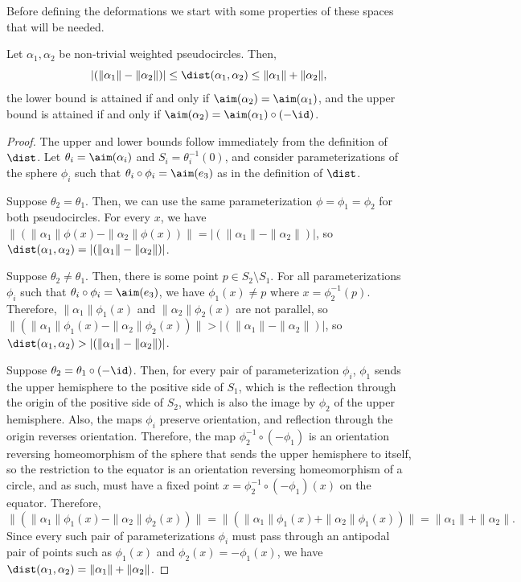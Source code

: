 Before defining the deformations we start with some properties of these spaces that will be needed.

\begin{lemma}\label{lemma-pseudocircle-dist}
Let $\alpha_1,\alpha_2$ be non-trivial weighted pseudocircles.
Then,
\[\left|\left(\|\alpha_1\|-\|\alpha_2\|\right)\right| \leq \dist(\alpha_1,\alpha_2) \leq \|\alpha_1\|+\|\alpha_2\|,\]
the lower bound is attained if and only if $\aim(\alpha_2) = \aim(\alpha_1)$,
and the upper bound is attained if and only if $\aim(\alpha_2) = \aim(\alpha_1)\circ(-\id)$.
\end{lemma}

\begin{proof}
The upper and lower bounds follow immediately from the definition of $\dist$.
Let $\theta_i = \aim(\alpha_i)$ and $S_i = \theta_i^{-1}(0)$,
and consider parameterizations of the sphere $\phi_i$ such that $\theta_i \circ \phi_i = \aim(e_3)$ as in the definition of $\dist$.

Suppose $\theta_2=\theta_1$. Then, we can use the same parameterization $\phi = \phi_1 = \phi_2$ for both pseudocircles.
For every $x$, we have
$\|(\|\alpha_1\|\phi(x) - \|\alpha_2\|\phi(x))\| = \left|(\|\alpha_1\|-\|\alpha_2\|)\right|$,
so $\dist(\alpha_1,\alpha_2) = \left|(\|\alpha_1\|-\|\alpha_2\|)\right|$.

Suppose $\theta_2\neq \theta_1$. Then, there is some point $p \in S_2 \setminus S_1$. For all parameterizations $\phi_i$ such that $\theta_i \circ \phi_i = \aim(e_3)$, we have $\phi_1(x) \neq p$ where $x = \phi_2^{-1}(p)$. Therefore, $\|\alpha_1\|\phi_1(x)$ and $\|\alpha_2\|\phi_2(x)$ are not parallel, so
$\|(\|\alpha_1\|\phi_1(x) - \|\alpha_2\|\phi_2(x))\| > \left|(\|\alpha_1\|-\|\alpha_2\|)\right|$,
so $\dist(\alpha_1,\alpha_2) > \left|(\|\alpha_1\|-\|\alpha_2\|)\right|$.

Suppose $\theta_2 = \theta_1\circ(-\id)$.
Then, for every pair of parameterization $\phi_i$, $\phi_1$ sends the upper hemisphere to the positive side of $S_1$, which is the reflection through the origin of the positive side of $S_2$, which is also the image by $\phi_2$ of the upper hemisphere.
Also, the maps $\phi_i$ preserve orientation, and reflection through the origin reverses orientation.
Therefore, the map $\phi_2^{-1}\circ (-\phi_1)$ is an orientation reversing homeomorphism of the sphere that sends the upper hemisphere to itself, so the restriction to the equator is an orientation reversing homeomorphism of a circle, and as such, must have a fixed point $x = \phi_2^{-1}\circ(-\phi_1)(x)$ on the equator. Therefore,
\[
\|(\|\alpha_1\|\phi_1(x) - \|\alpha_2\|\phi_2(x))\| = \|(\|\alpha_1\|\phi_1(x) + \|\alpha_2\|\phi_1(x))\| = \|\alpha_1\| + \|\alpha_2\|.
\]
Since every such pair of parameterizations $\phi_i$ must pass through an antipodal pair of points such as $\phi_1(x)$ and $\phi_2(x) = -\phi_1(x)$, we have $\dist(\alpha_1,\alpha_2) = \|\alpha_1\|+\|\alpha_2\|$.


\end{proof}
